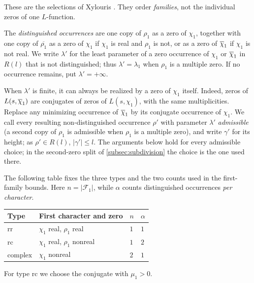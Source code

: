 These are the selections of Xylouris \cite[\S3.1.2]{Xylouris2011nullstellen}.
They order \emph{families}, not the individual zeros of one $L$-function.

\begin{definition}\label{def:additionalzero}
The \emph{distinguished occurrences} are one copy of $\rho_1$ as a zero of $\chi_1$, together with one
copy of $\overline{\rho_1}$ as a zero of $\chi_1$ if $\chi_1$ is real and $\rho_1$ is not, or as a zero of
$\overline{\chi}_1$ if $\chi_1$ is not real. We write $\lambda'$ for the least parameter of a zero occurrence of
$\chi_1$ or $\overline{\chi}_1$ in $R(l)$ that is not distinguished; thus $\lambda'=\lambda_1$ when $\rho_1$ is a
multiple zero. If no occurrence remains, put $\lambda'=+\infty$.
\end{definition}

When $\lambda'$ is finite, it can always be realized by a zero of $\chi_1$ itself.
Indeed, zeros of $L(s,\overline{\chi}_1)$ are conjugates of zeros of $L(s,\chi_1)$, with the same
multiplicities. Replace any minimizing occurrence of $\overline{\chi}_1$ by its conjugate
occurrence of $\chi_1$. We call every resulting non-distinguished occurrence $\rho'$
with parameter $\lambda'$ \emph{admissible} (a second copy of $\rho_1$ is admissible when
$\rho_1$ is a multiple zero), and
write $\gamma'$ for its height; as $\rho'\in R(l)$, $|\gamma'|\le l$. The arguments below hold for every admissible
choice; in the second-zero split of \cref{subsec:subdivision} the choice is the one used there.

The following table fixes the three types and the two counts used in the first-family
bounds. Here $n=|\mathcal F_1|$, while $\alpha$ counts distinguished occurrences
\emph{per character}.
\begin{center}
\begin{tabular}{@{}llll@{}}
\toprule
Type & First character and zero & $n$ & $\alpha$\\
\midrule
$\mathrm{rr}$ & $\chi_1$ real, $\rho_1$ real & $1$ & $1$\\
$\mathrm{rc}$ & $\chi_1$ real, $\rho_1$ nonreal & $1$ & $2$\\
$\mathrm{complex}$ & $\chi_1$ nonreal & $2$ & $1$\\
\bottomrule
\end{tabular}
\end{center}
For type $\mathrm{rc}$ we choose the conjugate with $\mu_1>0$.

